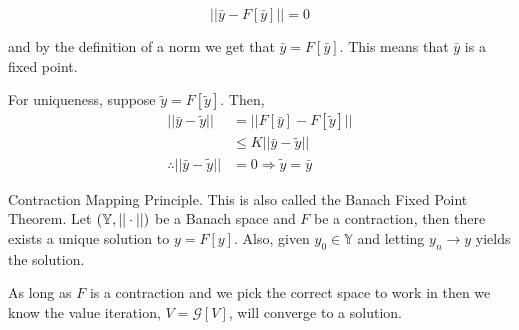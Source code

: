 \begin{equation*}
||\bar{y}-F[\bar{y}]|| = 0
\end{equation*}

and by the definition of a norm we get that $\bar{y}=F[\bar{y}]$.
This means that $\bar{y}$ is a fixed point.

For uniqueness, suppose $\tilde{y}=F[\tilde{y}]$.
Then,
\begin{align*}
||\bar{y}-\tilde{y}|| &= ||F[\bar{y}]-F[\tilde{y}]|| \\
&\leq K||\bar{y}-\tilde{y}|| \\
\therefore ||\bar{y}-\tilde{y}|| &= 0 \Rightarrow \tilde{y} = \bar{y}
\end{align*}

\begin{theorem}{Contraction Mapping Principle.}%
\label{th:bfp}
This is also called the Banach Fixed Point Theorem.
Let $(\mathbb{Y},||\cdot||)$ be a Banach space and $F$ be a contraction, then there exists a unique solution to $y=F[y]$.
Also, given $y_0\in\mathbb{Y}$ and letting $y_n\to y$ yields the solution.
\end{theorem}

As long as $F$ is a contraction and we pick the correct space to work in then we know the value iteration, $V=\mathcal{G}[V]$, will converge to a solution.
